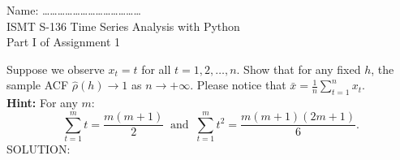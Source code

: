 \documentclass[12pt]{letter}
\begin{document}
\begin{flushleft}
{\sc Name: \ldots\ldots\ldots\ldots\ldots\ldots\ldots\ldots\ldots\ldots\ldots\ldots\ldots}\\
ISMT S-136 Time Series Analysis with Python\\
Part I of Assignment 1\\
\end{flushleft}

Suppose we observe $x_t=t$ for all $t=1,2,\ldots,n$. Show that for any fixed $h$, the sample ACF $\hat{\rho}(h)\to 1$ as $n\to +\infty$. Please notice that $\bar{x}=\frac{1}{n}\sum_{t=1}^{n} x_t$.\\
{\bf Hint:} For any $m$: $$\sum_{t=1}^m t=\frac{m(m+1)}{2} ~\text{ and }~ \sum_{t=1}^m t^2=\frac{m(m+1)(2m+1)}{6}.$$
SOLUTION:
\end{document}
